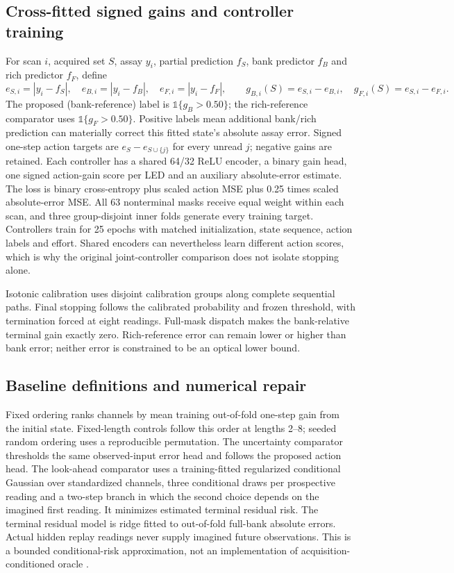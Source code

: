 \documentclass[10pt,a4paper]{article}
\begin{document}
\subsection{Cross-fitted signed gains and controller training}
For scan $i$, acquired set $S$, assay $y_i$, partial prediction $f_S$, bank predictor $f_B$ and rich predictor $f_F$, define
\[
 e_{S,i}=|y_i-f_S|,\quad e_{B,i}=|y_i-f_B|,\quad e_{F,i}=|y_i-f_F|,\qquad
 g_{B,i}(S)=e_{S,i}-e_{B,i},\quad g_{F,i}(S)=e_{S,i}-e_{F,i}.
\]
The proposed (bank-reference) label is $\mathbb{1}\{g_B>0.50\}$; the rich-reference comparator uses $\mathbb{1}\{g_F>0.50\}$. Positive labels mean additional bank/rich prediction can materially correct this fitted state's absolute assay error. Signed one-step action targets are $e_S-e_{S\cup\{j\}}$ for every unread $j$; negative gains are retained. Each controller has a shared 64/32 ReLU encoder, a binary gain head, one signed action-gain score per LED and an auxiliary absolute-error estimate. The loss is binary cross-entropy plus scaled action MSE plus 0.25 times scaled absolute-error MSE. All 63 nonterminal masks receive equal weight within each scan, and three group-disjoint inner folds generate every training target. Controllers train for 25 epochs with matched initialization, state sequence, action labels and effort. Shared encoders can nevertheless learn different action scores, which is why the original joint-controller comparison does not isolate stopping alone.

Isotonic calibration uses disjoint calibration groups along complete sequential paths. Final stopping follows the calibrated probability and frozen threshold, with termination forced at eight readings. Full-mask dispatch makes the bank-relative terminal gain exactly zero. Rich-reference error can remain lower or higher than bank error; neither error is constrained to be an optical lower bound.

\subsection{Baseline definitions and numerical repair}
Fixed ordering ranks channels by mean training out-of-fold one-step gain from the initial state. Fixed-length controls follow this order at lengths 2--8; seeded random ordering uses a reproducible permutation. The uncertainty comparator thresholds the same observed-input error head and follows the proposed action head. The look-ahead comparator uses a training-fitted regularized conditional Gaussian over standardized channels, three conditional draws per prospective reading and a two-step branch in which the second choice depends on the imagined first reading. It minimizes estimated terminal residual risk. The terminal residual model is ridge fitted to out-of-fold full-bank absolute errors. Actual hidden replay readings never supply imagined future observations. This is a bounded conditional-risk approximation, not an implementation of acquisition-conditioned oracle \citep{valancius2024}.
\end{document}
